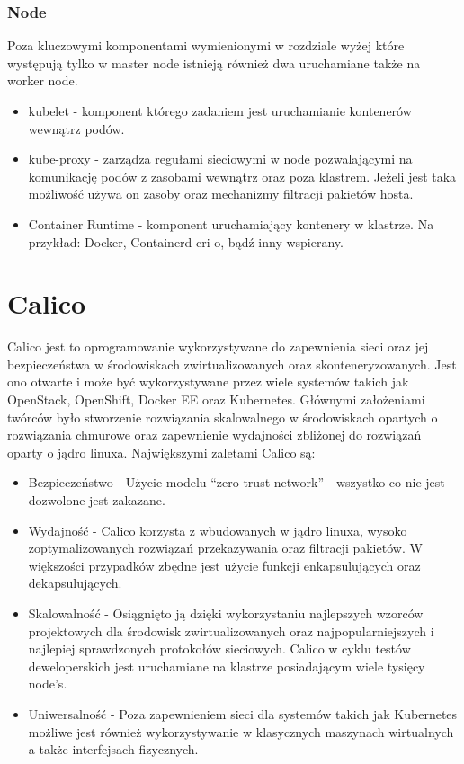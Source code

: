 \documentclass[pl,final,oneside]{mgr} %
\begin{document}
\subsubsection{Node}
Poza kluczowymi komponentami wymienionymi w rozdziale wyżej które występują tylko w master node istnieją również dwa uruchamiane także na worker node.
\begin{itemize}
	\item kubelet - komponent którego zadaniem jest uruchamianie kontenerów wewnątrz podów. 
	\item kube-proxy - zarządza regułami sieciowymi w node pozwalającymi na komunikację podów z zasobami wewnątrz oraz poza klastrem. Jeżeli jest taka możliwość używa on zasoby oraz mechanizmy filtracji pakietów hosta.
	\item Container Runtime - komponent uruchamiający kontenery w klastrze. Na przykład: Docker, Containerd cri-o, bądź inny wspierany.
\end{itemize}



\section{Calico}
Calico jest to oprogramowanie wykorzystywane do zapewnienia sieci oraz jej bezpieczeństwa w środowiskach zwirtualizowanych oraz skonteneryzowanych. Jest ono otwarte i może być wykorzystywane przez wiele systemów takich jak OpenStack, OpenShift, Docker EE oraz Kubernetes. Głównymi założeniami twórców było stworzenie rozwiązania skalowalnego w środowiskach opartych o rozwiązania chmurowe oraz zapewnienie wydajności zbliżonej do rozwiązań oparty o jądro linuxa. Największymi zaletami Calico są:
\begin{itemize}
	\item Bezpieczeństwo - Użycie modelu “zero trust network” - wszystko co nie jest dozwolone jest zakazane.
	\item Wydajność - Calico korzysta z wbudowanych w jądro linuxa, wysoko zoptymalizowanych rozwiązań przekazywania oraz filtracji pakietów. W większości przypadków zbędne jest użycie funkcji enkapsulujących oraz dekapsulujących.
	\item Skalowalność - Osiągnięto ją dzięki wykorzystaniu najlepszych wzorców projektowych dla środowisk zwirtualizowanych oraz najpopularniejszych i najlepiej sprawdzonych protokołów sieciowych. Calico w cyklu testów deweloperskich jest uruchamiane na klastrze posiadającym wiele tysięcy node’s. 
	\item Uniwersalność - Poza zapewnieniem sieci dla systemów takich jak Kubernetes możliwe jest również wykorzystywanie w klasycznych maszynach wirtualnych a także interfejsach fizycznych.
\end{itemize}
\end{document}
